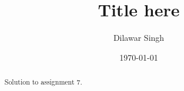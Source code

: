 \documentclass[a4paper,10pt]{article}
\title{Title here}
\author{Dilawar Singh}
\date{\today}
\begin{document}
\maketitle
\begin{abstract}

    Solution to assignment 7.

\end{abstract}
\end{document}
